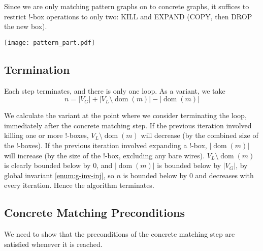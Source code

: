 \documentclass{article}
\DeclareMathOperator{\dom}{dom}
\begin{document}
Since we are only matching pattern graphs on to concrete graphs, it suffices to restrict $!$-box operations to only two: KILL and EXPAND (COPY, then DROP the new box).

\begin{center}
  \texttt{[image: pattern\_part.pdf]}
\end{center}


\subsection{Termination}

Each step terminates, and there is only one loop.  As a variant, we take
\[ n = |V_G| + |V_L\setminus\dom(m)| - |\dom(m)| \]

We calculate the variant at the point where we consider terminating the loop, immediately after the concrete matching step.  If the previous iteration involved killing one or more $!$-boxes, $V_L\setminus\dom(m)$ will decrease (by the combined size of the $!$-boxes).  If the previous iteration involved expanding a $!$-box, $|\dom(m)|$ will increase (by the size of the $!$-box, excluding any bare wires).  $V_L\setminus\dom(m)$ is clearly bounded below by $0$, and $|\dom(m)|$ is bounded below by $|V_G|$, by global invariant \ref{enum:g-inv-inj}, so $n$ is bounded below by $0$ and decreases with every iteration.  Hence the algorithm terminates.


\subsection{Concrete Matching Preconditions}

We need to show that the preconditions of the concrete matching step are satisfied whenever it is reached.
\end{document}
